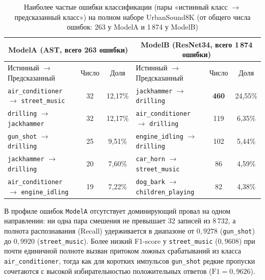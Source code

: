 \documentclass[pdflatex,sn-mathphys-num]{sn-jnl}
\begin{document}
\begin{table}[htbp]
\caption{Наиболее частые ошибки классификации (пары «истинный класс $\to$ предсказанный класс») на полном наборе UrbanSound8K (от общего числа ошибок: 263 у ModelA и 1\,874 у ModelB)}\label{tab:top_errors}
\footnotesize
\setlength{\tabcolsep}{4pt}
\begin{tabular}{|l|c|c|l|c|c|}
\hline
\multicolumn{3}{|c|}{ModelA (AST, всего 263 ошибки)} & \multicolumn{3}{c|}{ModelB (ResNet34, всего 1\,874 ошибки)} \\
\hline
Истинный $\to$ Предсказанный & Число & Доля & Истинный $\to$ Предсказанный & Число & Доля \\
\hline
\texttt{air\_conditioner} $\to$ \texttt{street\_music} & 32 & 12,17\% & \texttt{jackhammer} $\to$ \texttt{drilling} & \textbf{460} & 24,55\% \\
\hline
\texttt{drilling} $\to$ \texttt{jackhammer} & 32 & 12,17\% & \texttt{air\_conditioner} $\to$ \texttt{drilling} & 119 & 6,35\% \\
\hline
\texttt{gun\_shot} $\to$ \texttt{drilling} & 25 & 9,51\% & \texttt{engine\_idling} $\to$ \texttt{drilling} & 102 & 5,44\% \\
\hline
\texttt{jackhammer} $\to$ \texttt{drilling} & 20 & 7,60\% & \texttt{car\_horn} $\to$ \texttt{street\_music} & 86 & 4,59\% \\
\hline
\texttt{air\_conditioner} $\to$ \texttt{engine\_idling} & 19 & 7,22\% & \texttt{dog\_bark} $\to$ \texttt{children\_playing} & 82 & 4,38\% \\
\hline
\end{tabular}
\end{table}
\FloatBarrier

В профиле ошибок \texttt{ModelA} отсутствует доминирующий провал на одном направлении: ни одна пара смешения не превышает 32 записей из 8\,732, а полнота распознавания (Recall) удерживается в диапазоне от $0{,}9278$ (\texttt{gun\_shot}) до $0{,}9920$ (\texttt{street\_music}). Более низкий F1-score у \texttt{street\_music} ($0{,}9608$) при почти единичной полноте вызван притоком ложных срабатываний из класса \texttt{air\_conditioner}, тогда как для коротких импульсов \texttt{gun\_shot} редкие пропуски сочетаются с высокой избирательностью положительных ответов ($\text{F1} = 0{,}9626$).
\end{document}
